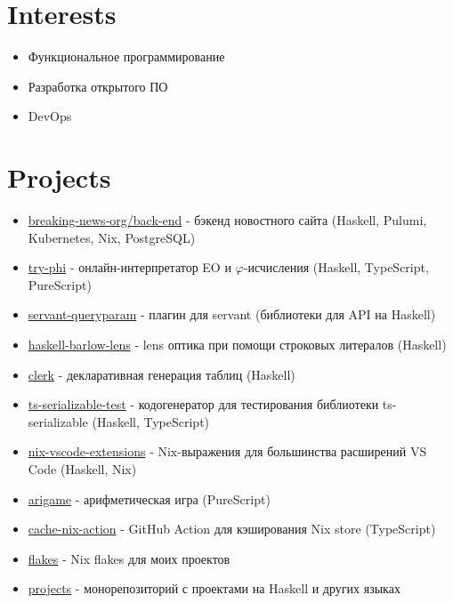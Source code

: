 \documentclass[twocolumn,11pt]{report}
\begin{document}
\section*{Interests}
\begin{itemize}
     \itemsep0em
     \item Функциональное программирование
     \item Разработка открытого ПО
     \item DevOps
\end{itemize}

\section*{Projects}
\begin{itemize}
     \itemsep0em
     \item \href{https://github.com/breaking-news-org/back-end#readme}{breaking-news-org/back-end} - бэкенд новостного сайта (Haskell, Pulumi, Kubernetes, Nix, PostgreSQL)
     \item \href{https://github.com/objectionary/try-phi#readme}{try-phi} - онлайн-интерпретатор EO и $\varphi$-исчисления (Haskell, TypeScript, PureScript)
     \item \href{https://github.com/deemp/servant-queryparam#readme}{servant-queryparam} - плагин для servant (библиотеки для API на Haskell)
     \item \href{https://github.com/deemp/haskell-barlow-lens#readme}{haskell-barlow-lens} - lens оптика при помощи строковых литералов (Haskell)
     \item \href{https://github.com/deemp/clerk#readme}{clerk} - декларативная генерация таблиц (Haskell)
     \item \href{https://github.com/deemp/projects/tree/main/haskell/ts-serializable-test#readme}{ts-serializable-test} - кодогенератор для тестирования библиотеки ts-serializable (Haskell, TypeScript)
     \item \href{https://github.com/nix-community/nix-vscode-extensions#readme}{nix-vscode-extensions} - Nix-выражения для большинства расширений VS Code (Haskell, Nix)
     \item \href{https://github.com/deemp/arigame#readme}{arigame} - арифметическая игра (PureScript)
     \item \href{https://github.com/nix-community/cache-nix-action#readme}{cache-nix-action} - GitHub Action для кэширования Nix store (TypeScript)
     \item \href{https://github.com/deemp/flakes#readme}{flakes} - Nix flakes для моих проектов
     \item \href{https://github.com/deemp/projects#readme}{projects} - монорепозиторий с проектами на Haskell и других языках
\end{itemize}
\end{document}
